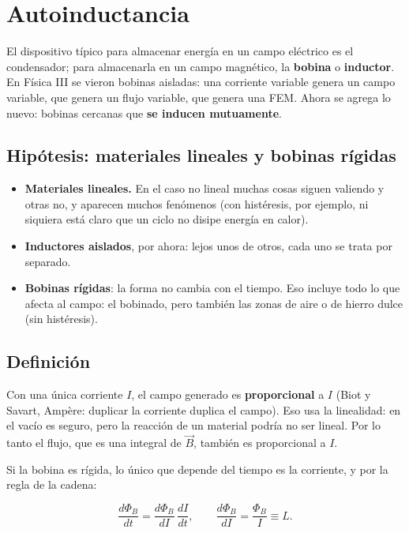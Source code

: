 \documentclass[12pt,a4paper]{article}
\begin{document}
\section{Autoinductancia}

El dispositivo típico para almacenar energía en un campo eléctrico es el
condensador; para almacenarla en un campo magnético, la \textbf{bobina} o
\textbf{inductor}. En Física III se vieron bobinas aisladas: una corriente variable
genera un campo variable, que genera un flujo variable, que genera una FEM.
Ahora se agrega lo nuevo: bobinas cercanas que \textbf{se inducen mutuamente}.

\subsection{Hipótesis: materiales lineales y bobinas rígidas}

\begin{itemize}
  \item \textbf{Materiales lineales.} En el caso no lineal muchas cosas siguen valiendo y
  otras no, y aparecen muchos fenómenos (con histéresis, por ejemplo, ni
  siquiera está claro que un ciclo no disipe energía en calor).
  \item \textbf{Inductores aislados}, por ahora: lejos unos de otros, cada uno se trata
  por separado.
  \item \textbf{Bobinas rígidas}: la forma no cambia con el tiempo. Eso incluye todo lo que
  afecta al campo: el bobinado, pero también las zonas de aire o de hierro
  dulce (sin histéresis).
\end{itemize}

\subsection{Definición}

Con una única corriente $I$, el campo generado es \textbf{proporcional} a $I$
(Biot y Savart, Ampère: duplicar la corriente duplica el campo). Eso usa la
linealidad: en el vacío es seguro, pero la reacción de un material podría no
ser lineal. Por lo tanto el flujo, que es una integral de $\vec B$, también es
proporcional a $I$.

Si la bobina es rígida, lo único que depende del tiempo es la corriente, y por
la regla de la cadena:

\[
\frac{d\Phi_B}{dt} = \frac{d\Phi_B}{dI}\,\frac{dI}{dt},
\qquad
\frac{d\Phi_B}{dI} = \frac{\Phi_B}{I} \equiv L .
\]
\end{document}
